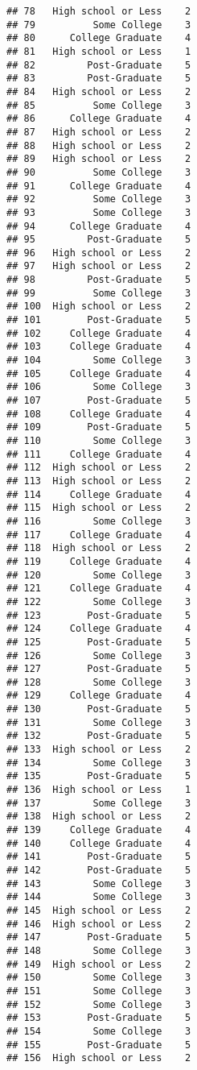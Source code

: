 \documentclass[
]{article}
\begin{document}
\begin{verbatim}
## 78   High school or Less    2
## 79          Some College    3
## 80      College Graduate    4
## 81   High school or Less    1
## 82         Post-Graduate    5
## 83         Post-Graduate    5
## 84   High school or Less    2
## 85          Some College    3
## 86      College Graduate    4
## 87   High school or Less    2
## 88   High school or Less    2
## 89   High school or Less    2
## 90          Some College    3
## 91      College Graduate    4
## 92          Some College    3
## 93          Some College    3
## 94      College Graduate    4
## 95         Post-Graduate    5
## 96   High school or Less    2
## 97   High school or Less    2
## 98         Post-Graduate    5
## 99          Some College    3
## 100  High school or Less    2
## 101        Post-Graduate    5
## 102     College Graduate    4
## 103     College Graduate    4
## 104         Some College    3
## 105     College Graduate    4
## 106         Some College    3
## 107        Post-Graduate    5
## 108     College Graduate    4
## 109        Post-Graduate    5
## 110         Some College    3
## 111     College Graduate    4
## 112  High school or Less    2
## 113  High school or Less    2
## 114     College Graduate    4
## 115  High school or Less    2
## 116         Some College    3
## 117     College Graduate    4
## 118  High school or Less    2
## 119     College Graduate    4
## 120         Some College    3
## 121     College Graduate    4
## 122         Some College    3
## 123        Post-Graduate    5
## 124     College Graduate    4
## 125        Post-Graduate    5
## 126         Some College    3
## 127        Post-Graduate    5
## 128         Some College    3
## 129     College Graduate    4
## 130        Post-Graduate    5
## 131         Some College    3
## 132        Post-Graduate    5
## 133  High school or Less    2
## 134         Some College    3
## 135        Post-Graduate    5
## 136  High school or Less    1
## 137         Some College    3
## 138  High school or Less    2
## 139     College Graduate    4
## 140     College Graduate    4
## 141        Post-Graduate    5
## 142        Post-Graduate    5
## 143         Some College    3
## 144         Some College    3
## 145  High school or Less    2
## 146  High school or Less    2
## 147        Post-Graduate    5
## 148         Some College    3
## 149  High school or Less    2
## 150         Some College    3
## 151         Some College    3
## 152         Some College    3
## 153        Post-Graduate    5
## 154         Some College    3
## 155        Post-Graduate    5
## 156  High school or Less    2

\end{verbatim}
\end{document}
